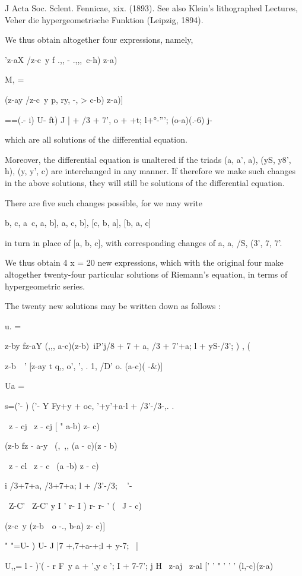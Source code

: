 J Acta Soc. Sclent. Fennicae, xix. (1893). See also Klein's
lithographed Lectures, Veher die hypergeometrische Funktion (Leipzig,
1894).

%
%

We thus obtain altogether four expressions, namely,

'z-aX /z-c\ y f .,, - .,,,\ c-h) z-a)\

M, =

(z-ay /z-c\ y p, ry, -, > c-b) z-a)]

 ==(.- i) U- ft) J | + /3 + 7', o + +t; l+°-'''; (o-a)(.-6) j-

which are all solutions of the differential equation.

Moreover, the differential equation is unaltered if the triads (a, a',
a), (yS, y8', h), (y, y', c) are interchanged in any manner. If
therefore we make such changes in the above solutions, they will still
be solutions of the differential equation.

There are five such changes possible, for we may write

 b, c, a\, c, a, b], a, c, b], [c, b, a], [b, a, c]

in turn in place of [a, b, c], with corresponding changes of a, a, /S,
(3', 7, 7'.

We thus obtain 4 x = 20 new expressions, which with the original four
make altogether twenty-four particular solutions of Riemann's
equation, in terms of hypergeometric series.

The twenty new solutions may be written down as follows :

u. =

z-by fz-aY (,,, a-c)(z-b)\ iP'j/8 + 7 + a, /3 + 7'+a; l + yS-/3'; )
, (

z-b\ \ ' [z-ay t q,, o', ', . 1, /D' o. (a-c)( -\&)]

Ua =

 s=('- ) ('- Y Fy+y + oc, '+y'+a-l + /3'-/3-,. .

\ z - cj \ z - cj [ " a-b) z- c)

(z-b fz - a-y \ (, \,,, (a - c)(z - b)

\ z - cl \ z - c \ (a -b) z - c)

i /3+7+a, /3+7+a; l + /3'-/3; ~ '-\

\ Z-C' \ Z-C' y I ' r- I ) r- r- ' ( \ J - c)\

(z-c\ y (z-b\ \, o -., b-a) z- c)]

" "=U- ) U- J |7 +,7+a-+;l + y-7; \; \ |

U,,= l - )'( - r F\ y a + ',y c '; I + 7-7'; j H \ z-aj \ z-al [' ' "
' ' ' (l,-c)(z-a)\

